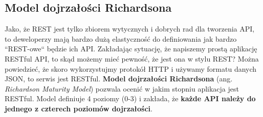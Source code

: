 \documentclass[oneside,polski,logo,indent]{amuthesis}
\begin{document}
\begin{center}
\section{Model dojrzałości Richardsona}
\end{center}

Jako, że REST jest tylko zbiorem wytycznych i dobrych rad dla tworzenia API, to deweloperzy mają bardzo dużą elastyczność do definiowania jak bardzo ``REST-owe`` będzie ich API. Zakładając sytuację, że napiszemy prostą aplikację RESTful API, to skąd możemy mieć pewność, że jest ona w stylu REST? Można powiedzieć, że skoro wykorzystujmy protokół HTTP i używamy formatu danych JSON, to serwis jest RESTful. \textbf{Model dojrzałości Richardsona} (ang. \emph{Richardson Maturity Model}) pozwala ocenić w jakim stopniu aplikacja jest RESTful. Model definiuje 4 poziomy (0-3) i zakłada, że \textbf{każde API należy do jednego z czterech poziomów dojrzałości}.
\end{document}
